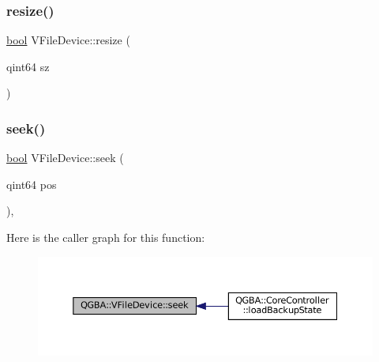 \mbox{\label{class_q_g_b_a_1_1_v_file_device_ab112e876255ade205c6d13fe08999552}} 
\subsubsection{\texorpdfstring{resize()}{resize()}}
{\footnotesize\ttfamily \mbox{\hyperlink{libretro_8h_a4a26dcae73fb7e1528214a068aca317e}{bool}} V\+File\+Device\+::resize (\begin{DoxyParamCaption}\item[{qint64}]{sz }\end{DoxyParamCaption})}

\mbox{\label{class_q_g_b_a_1_1_v_file_device_a4454f8254c8074592cb16a0c0edcd8d5}} 
\subsubsection{\texorpdfstring{seek()}{seek()}}
{\footnotesize\ttfamily \mbox{\hyperlink{libretro_8h_a4a26dcae73fb7e1528214a068aca317e}{bool}} V\+File\+Device\+::seek (\begin{DoxyParamCaption}\item[{qint64}]{pos }\end{DoxyParamCaption})\hspace{0.3cm}{\ttfamily [override]}, {\ttfamily [virtual]}}

Here is the caller graph for this function\+:
\nopagebreak
\begin{figure}[H]
\begin{center}
\leavevmode
\includegraphics[width=350pt]{class_q_g_b_a_1_1_v_file_device_a4454f8254c8074592cb16a0c0edcd8d5_icgraph}
\end{center}
\end{figure}
\mbox{\label{class_q_g_b_a_1_1_v_file_device_a0798006418f2d769eba5f472836c6b70}} 
